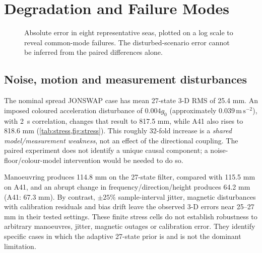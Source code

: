 \documentclass[conference]{IEEEtran}
\newcommand{\InputPart}[1]{}
\begin{document}
\section{Degradation and Failure Modes}
\label{sec:degrade}
\begin{table}[!t]
\caption{Absolute 3-D position RMS from matched 30-seed simulations.
Positive values in the last column mean \emph{worse} 27-state error:
$100(E_{27}/E_{\rm A41}-1)$. This sign is intentionally opposite
to the improvement measure in \cref{fig:ablation}. Disturbed scenarios
alter the data-generating process; they are not controlled one-factor
parameter variations of an identical truth trajectory.}
\label{tab:stress}
\centering\small
\InputPart{csm27-paper-degradation.tex-part}
\end{table}

\begin{figure}[!t]
\centering

\caption{Absolute error in eight representative seas, plotted on a log
scale to reveal common-mode failures. The disturbed-scenario error cannot
be inferred from the paired differences alone.}
\label{fig:stress}
\end{figure}

\subsection{Noise, motion and measurement disturbances}
The nominal spread JONSWAP case has mean 27-state 3-D RMS of 25.4 mm.
An imposed coloured acceleration disturbance of $0.004g_0$ (approximately
$0.039\,\mathrm{m\,s^{-2}}$), with \SI{2}{s} correlation, changes that
result to 817.5 mm, while A41
also rises to 818.6 mm (\cref{tab:stress,fig:stress}). This roughly
32-fold increase is a \emph{shared model/measurement weakness}, not an
effect of the directional coupling. The paired experiment does not identify a unique causal component;
a noise-floor/colour-model intervention would be needed to do so.

Manoeuvring produces 114.8 mm on the 27-state filter, compared with
115.5 mm on A41, and an abrupt change in frequency/direction/height
produces 64.2 mm (A41: 67.3 mm). By contrast, $\pm25\%$ sample-interval jitter, magnetic
disturbances with calibration residuals and bias drift leave the observed
3-D errors near 25--27 mm in their tested settings. These finite stress
cells do not establish robustness to arbitrary manoeuvres, jitter, magnetic
outages or calibration error. They identify specific cases in which the
adaptive 27-state prior is and is not the dominant limitation.
\end{document}

